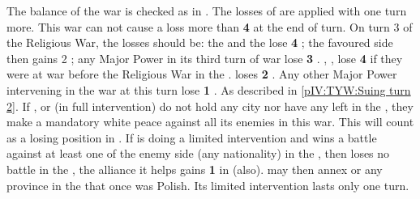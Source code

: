 \phpaix
\aparag The balance of the war is checked as in .  The losses of \STAB are applied with one turn more. This war can not
cause a loss more than {\bf 4} \STAB at the end of turn.  On turn 3 of the
Religious War, the losses should be:
\bparag the \alliance and the \ligue lose {\bf 4} \STAB;
\bparag the favoured side then gains 2 \STAB;
\bparag any Major Power in its third turn of war lose {\bf 3} \STAB.
\bparag \SPA, \HOL, \AUS lose {\bf 4} \STAB if they were at war before the
Religious War in the \HRE.
\bparag \SUE loses {\bf 2} \STAB.
\bparag Any other Major Power intervening in the war at this turn lose {\bf 1}
\STAB.
 As described in \ref{pIV:TYW:Suing turn 2}.
\aparag If \SUE, \ENG or \POL (in full intervention) do not hold any city nor
have any \ARMY left in the \HRE, they make a mandatory white peace
against all its enemies in this war. This will count as a losing position in
.
\aparag If \POL is doing a limited intervention and wins a battle against at
least one \ARMY\faceplus of the enemy side (any nationality) in the \HRE, then
loses no battle in the \HRE, the alliance it helps gains {\bf 1} in \STAB
(\AUS also). \POL may then annex  or any province in the
\HRE that once was Polish. Its limited intervention lasts only one turn.


